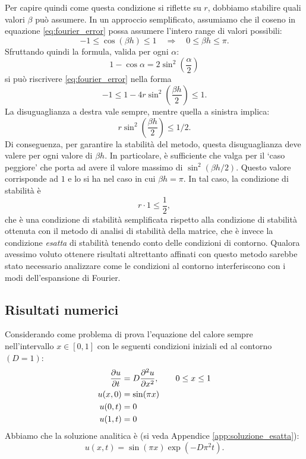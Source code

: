\documentclass[10pt,a4paper]{article}
\begin{document}
Per capire quindi come questa condizione si riflette su $r$, dobbiamo stabilire quali valori $\beta$ può assumere. In un approccio semplificato, assumiamo che il coseno in equazione \eqref{eq:fourier_error} possa assumere l'intero range di valori possibili:
\begin{equation}
	-1 \leq \cos(\beta h) \leq 1 \quad\Rightarrow\quad 0 \leq \beta h \leq \pi.
\end{equation}
Sfruttando quindi la formula, valida per ogni $\alpha$:
\begin{equation}
	1-\cos{\alpha} = 2 \sin^2\left(\frac{\alpha}{2}\right)
\end{equation}
si può riscrivere \eqref{eq:fourier_error} nella forma
\begin{equation}
	-1 \leq 1 - 4r \sin^2\left(\frac{\beta h}{2}\right) \leq 1. 
\end{equation}
La disuguaglianza a destra vale sempre, mentre quella a sinistra implica:
\begin{equation}
	r \sin^2\left(\frac{\beta h}{2}\right) \leq 1/2.
\end{equation}
Di conseguenza, per garantire la stabilità del metodo, questa disuguaglianza deve valere per ogni valore di $\beta h$. In particolare, è sufficiente che valga per il `caso peggiore' che porta ad avere il valore massimo di $\sin^2(\beta h/2)$. Questo valore corrisponde ad $1$ e lo si ha nel caso in cui $\beta h = \pi$. In tal caso, la condizione di stabilità è
\begin{equation}
	r \cdot 1 \leq \frac{1}{2},
\end{equation}
che è una condizione di stabilità semplificata rispetto alla condizione di stabilità ottenuta con il metodo di analisi di stabilità della matrice, che è invece la condizione \textit{esatta} di stabilità tenendo conto delle condizioni di contorno. Qualora avessimo voluto ottenere risultati altrettanto affinati con questo metodo sarebbe stato necessario analizzare come le condizioni al contorno interferiscono con i modi dell'espansione di Fourier.

\subsection{Risultati numerici}

Considerando come problema di prova l'equazione del calore sempre nell'intervallo $x\in[0,1]$ con le seguenti condizioni iniziali ed al contorno $(D=1)$:
\begin{align}
	\pdv{u}{t} &= D \pdv[2]{u}{x}, \quad\quad 0\leq x \leq 1\\
	u(x,0) &= \sin(\pi x)\\
	u(0,t) &= 0\\
	u(1,t) &= 0
\end{align}
Abbiamo che la soluzione analitica è (si veda Appendice \ref{app:soluzione_esatta}):
\begin{equation}
	u(x,t) = \sin(\pi x)\exp(- D \pi^2 t).
\end{equation}
\end{document}
